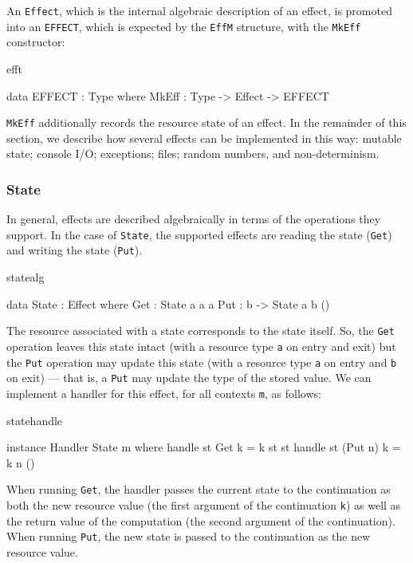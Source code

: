 An \texttt{Effect}, which is the internal algebraic description of an effect,
is promoted into an \texttt{EFFECT}, which is expected by the \texttt{EffM}
structure, with the \texttt{MkEff} constructor:

\begin{SaveVerbatim}{efft}

data EFFECT : Type where
     MkEff : Type -> Effect -> EFFECT

\end{SaveVerbatim}

\noindent
\texttt{MkEff} additionally records the resource state of an effect.
In the remainder of this section, we describe how several effects can be
implemented in this way: mutable state; console I/O; exceptions; files; random
numbers, and non-determinism.

\subsubsection{State}

In general, effects are described algebraically in terms of the operations
they support. In the case of \texttt{State}, the supported effects are reading
the state (\texttt{Get}) and writing the state (\texttt{Put}).

\begin{SaveVerbatim}{statealg}

data State : Effect where
     Get :      State a a a
     Put : b -> State a b ()

\end{SaveVerbatim}

\noindent
The resource associated with a state corresponds to the state itself. So,
the \texttt{Get} operation leaves this state intact (with a resource type
\texttt{a} on entry and exit) but the \texttt{Put} operation may update this
state (with a resource type \texttt{a} on entry and \texttt{b} on exit)
--- that is, a \texttt{Put} may update the type of the stored value.
We can implement a handler for this effect, for all contexts \texttt{m},
as follows:

\begin{SaveVerbatim}{statehandle}

instance Handler State m where
     handle st Get     k = k st st
     handle st (Put n) k = k n ()

\end{SaveVerbatim}

\noindent
When running \texttt{Get}, the handler passes the current state to the
continuation as both the new resource value (the first argument of the
continuation \texttt{k}) as well as the return value of the computation (the
second argument of the continuation). When running \texttt{Put}, the new state
is passed to the continuation as the new resource value.


